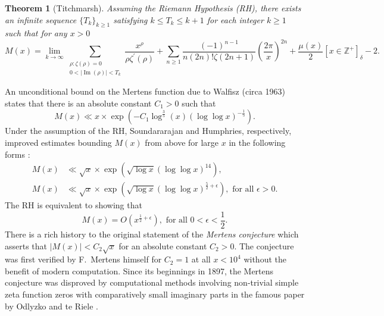 \documentclass[11pt,reqno,a4letter]{article}
\numberwithin{equation}{section}
\numberwithin{figure}{section}
\numberwithin{table}{section}
\newcommand{\Iverson}[1]{\ensuremath{\left[#1\right]_{\delta}}}
\theoremstyle{plain}
\newtheorem{theorem}{Theorem}
\numberwithin{theorem}{section}
\theoremstyle{definition}
\renewcommand{\Im}{\operatorname{Im}}
\begin{document}
\begin{theorem}[Titchmarsh] 
\label{theorem_MxMellinTransformInvFormula} 
Assuming the Riemann Hypothesis (RH), there exists an infinite sequence 
$\{T_k\}_{k \geq 1}$ satisfying $k \leq T_k \leq k+1$ for each integer $k \geq 1$ 
such that for any $x > 0$ 
\[
M(x) = \lim_{k \rightarrow \infty} 
     \sum_{\substack{\rho: \zeta(\rho) = 0 \\ 0 < |\Im(\rho)| < T_k}} 
     \frac{x^{\rho}}{\rho \zeta^{\prime}(\rho)} + 
     \sum_{n \geq 1} \frac{(-1)^{n-1}}{n (2n)! \zeta(2n+1)} 
     \left(\frac{2\pi}{x}\right)^{2n} + 
     \frac{\mu(x)}{2} \Iverson{x \in \mathbb{Z}^{+}} - 2. 
\] 
\end{theorem} 

An unconditional bound on the Mertens function due to Walfisz (circa 1963) 
states that there is an absolute constant $C_1 > 0$ such that 
$$M(x) \ll x \times \exp\left(-C_1 \log^{\frac{3}{5}}(x) 
  (\log\log x)^{-\frac{1}{5}}\right).$$ 
Under the assumption of the RH, Soundararajan and Humphries, respectively, 
improved estimates bounding $M(x)$ from above for large $x$ in the 
following forms 
\cite{SOUND-MERTENS-ANNALS,HUMPHRIES-JNT-2013}: 
\begin{align*} 
M(x) & \ll \sqrt{x} \times \exp\left(\sqrt{\log x} (\log\log x)^{14}\right), \\ 
M(x) & \ll \sqrt{x} \times \exp\left( 
     \sqrt{\log x} (\log\log x)^{\frac{5}{2}+\epsilon}\right), 
     \text{ for all } \epsilon > 0. 
\end{align*} 
The RH is equivalent to showing that 
\begin{equation} 
\label{eqn_MertensMx_RHEquivProblem_Stmt_intro} 
M(x) = O\left(x^{\frac{1}{2}+\epsilon}\right), \text{ for all } 0 < \epsilon < \frac{1}{2}.
\end{equation}
There is a rich history to the original statement of the \emph{Mertens conjecture} which 
asserts that $|M(x)| < C_2 \sqrt{x}$ for an absolute constant $C_2 > 0$. 
The conjecture was first verified by F.~Mertens himself for $C_2 = 1$ at all $x < 10^{4}$ 
without the benefit of modern computation. 
Since its beginnings in 1897, the Mertens conjecture was disproved by computational methods involving 
non-trivial simple zeta function zeros with comparatively small imaginary parts in the 
famous paper by Odlyzko and te Riele \cite{ODLYZ-TRIELE}. 
\end{document}

